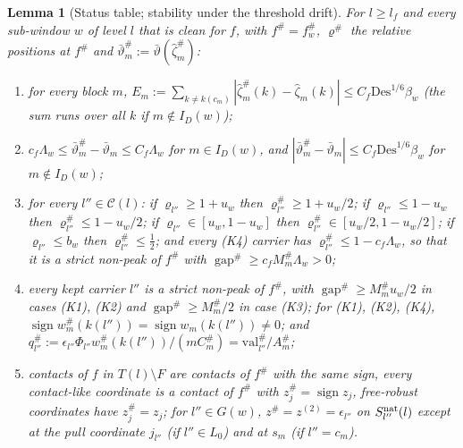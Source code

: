 \documentclass[10pt]{amsart}
\newtheorem{lemma}[theorem]{Lemma}
\theoremstyle{definition}
\theoremstyle{remark}
\newcommand{\sgn}{\operatorname{sign}}
\newcommand{\gap}{\operatorname{gap}}
\begin{document}
\begin{lemma}[Status table; stability under the threshold drift]
\label{lem:II-status}
For $l\ge l_f$ and every sub-window $w$ of level $l$ that is clean for $f$,
with $f^\#=f^\#_w$, $\varrho^\#$ the relative positions at $f^\#$ and
$\bar\vartheta^\#_m:=\bar\vartheta(\hat\zeta^\#_m)$:
\begin{enumerate}
\item[(a)] for every block $m$, $E_m:=\sum_{k\ne k(c_m)}|\hat\zeta^\#_m(k)-
\hat\zeta_m(k)|\le C_f\mathrm{Des}^{1/6}\beta_w$ \textup{(}the sum runs over
all $k$ if $m\notin I_D(w)$\textup{)};
\item[(b)] $c_f\Lambda_w\le\bar\vartheta^\#_m-\bar\vartheta_m\le C_f\Lambda_w$ for $m\in
I_D(w)$, and $|\bar\vartheta^\#_m-\bar\vartheta_m|\le C_f\mathrm{Des}^{1/6}\beta_w$ for
$m\notin I_D(w)$;
\item[(c)] for every $l''\in\mathcal C(l)$: if $\varrho_{l''}\ge1+u_w$ then
$\varrho^\#_{l''}\ge1+u_w/2$; if $\varrho_{l''}\le1-u_w$ then $\varrho^\#_{l''}\le
1-u_w/2$; if $\varrho_{l''}\in[u_w,1-u_w]$ then $\varrho^\#_{l''}\in[u_w/2,
1-u_w/2]$; if $\varrho_{l''}\le b_w$ then $\varrho^\#_{l''}\le\frac12$; and every
\textup{(K4)} carrier has $\varrho^\#_{l''}\le1-c_f\Lambda_w$, so that it is a
strict non-peak of $f^\#$ with $\gap^\#\ge c_fM^\#_m\Lambda_w>0$;
\item[(d)] every kept carrier $l''$ is a strict non-peak of $f^\#$, with
$\gap^\#\ge M^\#_mu_w/2$ in cases \textup{(K1), (K2)} and $\gap^\#\ge
M^\#_m/2$ in case \textup{(K3)}; for \textup{(K1), (K2), (K4)},
$\sgn w^\#_m(k(l''))=\sgn w_m(k(l''))\ne0$; and $q^\#_{l''}:=
\epsilon_{l''}\Phi_{l''}w^\#_m(k(l''))/(mC^\#_m)=\mathrm{val}^\#_{l''}/A^\#_m$;
\item[(e)] contacts of $f$ in $T(l)\setminus F$ are contacts of $f^\#$ with
the same sign, every contact-like coordinate is a contact of $f^\#$ with
$z^\#_j=\sgn z_j$, free-robust coordinates have $z^\#_j=z_j$; for
$l''\in G(w)$, $z^\#=z^{(2)}=\epsilon_{l''}$ on $S^{\rm nat}_{l''}(l)$ except at
the pull coordinate $j_{l''}$ \textup{(}if $l''\in L_0$\textup{)} and at
$s_m$ \textup{(}if $l''=c_m$\textup{)}.
\end{enumerate}
\end{lemma}
\end{document}
